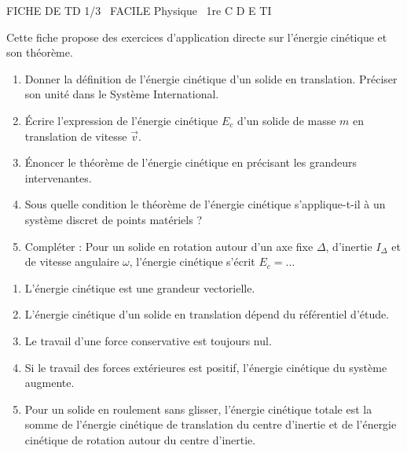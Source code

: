 \documentclass[11pt]{article}
\begin{document}
\begin{tcolorbox}[enhanced,colback=popink,colframe=popink,arc=10pt,boxrule=0pt,left=12pt,right=12pt,top=9pt,bottom=9pt]
{\color{white}\popxbold\small FICHE DE TD 1/3 \textbullet\ FACILE \hfill Physique \textbullet\ 1re C D E TI\par}
\end{tcolorbox}
\vspace{4pt}
Cette fiche propose des exercices d'application directe sur l'énergie cinétique et son théorème.

\begin{exercice}
\begin{enumerate}
    \item Donner la définition de l'énergie cinétique d'un solide en translation. Préciser son unité dans le Système International.
    \item Écrire l'expression de l'énergie cinétique $E_c$ d'un solide de masse $m$ en translation de vitesse $\vec{v}$.
    \item Énoncer le théorème de l'énergie cinétique en précisant les grandeurs intervenantes.
    \item Sous quelle condition le théorème de l'énergie cinétique s'applique-t-il à un système discret de points matériels ?
    \item Compléter : Pour un solide en rotation autour d'un axe fixe $\Delta$, d'inertie $I_\Delta$ et de vitesse angulaire $\omega$, l'énergie cinétique s'écrit $E_c = \ldots$
\end{enumerate}
\end{exercice}

\begin{exercice}
\begin{enumerate}
    \item L'énergie cinétique est une grandeur vectorielle.
    \item L'énergie cinétique d'un solide en translation dépend du référentiel d'étude.
    \item Le travail d'une force conservative est toujours nul.
    \item Si le travail des forces extérieures est positif, l'énergie cinétique du système augmente.
    \item Pour un solide en roulement sans glisser, l'énergie cinétique totale est la somme de l'énergie cinétique de translation du centre d'inertie et de l'énergie cinétique de rotation autour du centre d'inertie.
\end{enumerate}
\end{exercice}
\end{document}
